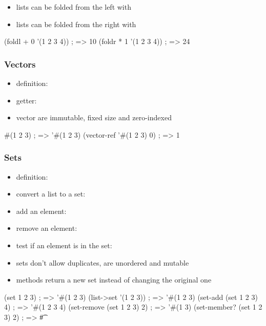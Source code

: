 \documentclass[a4paper,landscape,10pt]{article}
\begin{document}
\begin{multicols*}{2}
  \begin{itemize}
    \item lists can be folded from the left with 
    \item lists can be folded from the right with 
  \end{itemize}

  \begin{racket}
(foldl + 0 '(1 2 3 4)) ; => 10
(foldr * 1 '(1 2 3 4)) ; => 24
  \end{racket}

  \subsubsection{Vectors}

  \begin{itemize}
    \item definition: 
    \item getter: 
    \item vector are immutable, fixed size and zero-indexed
  \end{itemize}

  \begin{racket}
#(1 2 3) ; => '#(1 2 3)
(vector-ref '#(1 2 3) 0) ; => 1
  \end{racket}

  \breakcolumn

  \subsubsection{Sets}

  \begin{itemize}
    \item definition: 
    \item convert a list to a set: 
    \item add an element: 
    \item remove an element: 
    \item test if an element is in the set: 
    \item sets don't allow duplicates, are unordered and mutable
    \item methods return a new set instead of changing the original one
  \end{itemize}

  \begin{racket}
(set 1 2 3) ; => '#(1 2 3)
(list->set '(1 2 3)) ; => '#(1 2 3)
(set-add (set 1 2 3) 4) ; => '#(1 2 3 4)
(set-remove (set 1 2 3) 2) ; => '#(1 3)
(set-member? (set 1 2 3) 2) ; => #\t
  \end{racket}


\end{multicols*}
\end{document}
